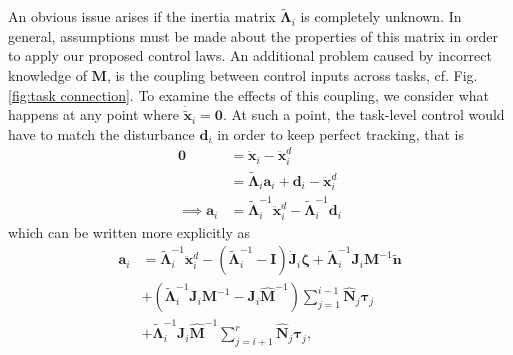 \documentclass[../main.tex]{subfiles}
\begin{document}
An obvious issue arises if the inertia matrix $\tilde{\bm{\Lambda}}_i$ is completely unknown. In general, assumptions must be made about the properties of this matrix in order to apply our proposed control laws. An additional problem caused by incorrect knowledge of $\bm{M}$, is the coupling between control inputs across tasks, cf. Fig. \ref{fig:task connection}. To examine the effects of this coupling, we consider what happens at any point where $\ddot{\tilde{\bm{x}}}_i = \bm{0}$. At such a point, the task-level control would have to match the disturbance $\bm{d}_i$ in order to keep perfect tracking, that is
\begin{align}
    \bm{0} &= \ddot{\bm{x}}_i - \ddot{\bm{x}}_i^d\\
    &= \tilde{\bm{\Lambda}}_i \bm{a}_i + \bm{d}_i - \ddot{\bm{x}}_i^d \\
    \implies \bm{a}_i &= \tilde{\bm{\Lambda}}_i^{-1}\ddot{\bm{x}}_i^d - \tilde{\bm{\Lambda}}_i^{-1} \bm{d}_i
\end{align}
which can be written more explicitly as
\begin{equation}
    \begin{aligned}
        \bm{a}_i &= \tilde{\bm{\Lambda}}_i^{-1}\ddot{\bm{x}}_i^d
        - (\tilde{\bm{\Lambda}}_i^{-1} - \bm{I})\dot{\bm{J}}_i \bm{\zeta}
        + \tilde{\bm{\Lambda}}_i^{-1}\bm{J}_i\bm{M}^{-1}\tilde{\bm{n}} \\
        &+ \left(\tilde{\bm{\Lambda}}_i^{-1}\bm{J}_i\bm{M}^{-1} - \bm{J}_i\hat{\bm{M}}^{-1}\right)\sum_{j=1}^{i-1}\hat{\bm{N}}_j\bm{\tau}_j \\
        &+ \tilde{\bm{\Lambda}}_i^{-1}\bm{J}_i
        \hat{\bm{M}}^{-1}\sum_{j=i+1}^{r}\hat{\bm{N}}_j\bm{\tau}_j,
    \end{aligned}
\end{equation}
\end{document}
